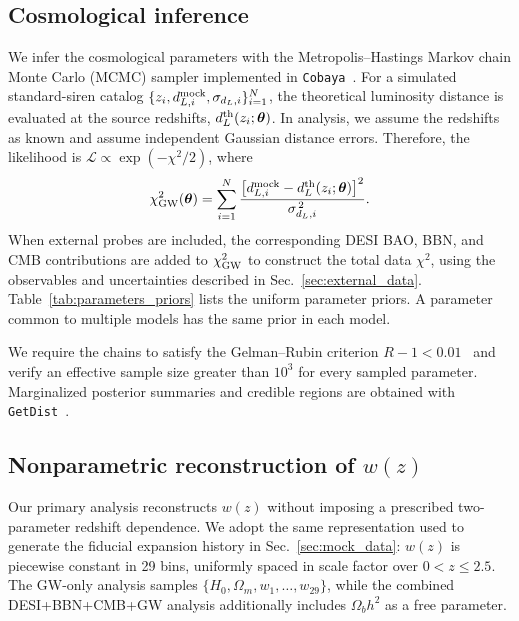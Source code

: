\documentclass[
  aps,
  prd,
  twocolumn,
  nofootinbib,
  superscriptaddress,
  floatfix,
  longbibliography
]{revtex4-2}
\begin{document}
\subsection{Cosmological inference}
\label{sec:likelihood_sampling}

We infer the cosmological parameters with the Metropolis--Hastings Markov
chain Monte Carlo (MCMC) sampler implemented in
\texttt{Cobaya}~\cite{Torrado2021}. For a simulated standard-siren catalog
$\{z_i,d_{L,i}^{\rm mock},\sigma_{d_L,i}\}_{i=1}^{N}$, the theoretical
luminosity distance is evaluated at the source redshifts,
$d_L^{\rm th}(z_i;\boldsymbol{\theta})$. In analysis, we assume the redshifts as known
and assume independent Gaussian distance errors. Therefore, the likelihood is
$\mathcal{L}\propto\exp(-\chi^2/2)$, where
\begin{equation}
 \chi^2_{\rm GW}(\boldsymbol{\theta}) =
 \sum_{i=1}^{N}
 \frac{\left[d_{L,i}^{\rm mock}
 -d_L^{\rm th}(z_i;\boldsymbol{\theta})\right]^2}
 {\sigma_{d_L,i}^{\,2}}.
 \label{eq:gw_chi2}
\end{equation}
When external probes are included, the corresponding DESI BAO, BBN, and CMB contributions
are added to $\chi^2_{\rm GW}$ to construct the total data $\chi^2$, using the observables
and uncertainties described in Sec.~\ref{sec:external_data}.
Table~\ref{tab:parameters_priors} lists the uniform parameter priors. A
parameter common to multiple models has the same prior in each model.



We require the chains to satisfy the Gelman--Rubin criterion
$R-1<0.01$~\cite{GelmanRubin} and verify an effective sample size greater
than $10^3$ for every sampled parameter. Marginalized posterior summaries
and credible regions are obtained with \texttt{GetDist}~\cite{Lewis_2019}.


\subsection{Nonparametric reconstruction of \texorpdfstring{$w(z)$}{w(z)}}
\label{sec:nonparametric_reconstruction}

Our primary analysis reconstructs $w(z)$ without imposing a prescribed
two-parameter redshift dependence. We adopt the same representation used
to generate the fiducial expansion history in Sec.~\ref{sec:mock_data}:
$w(z)$ is piecewise constant in 29 bins, uniformly spaced in scale factor
over $0<z\leq2.5$. The GW-only analysis samples
$\{H_0,\Omega_m,w_1,\ldots,w_{29}\}$, while the combined
DESI+BBN+CMB+GW analysis additionally includes
$\Omega_b h^2$ as a free parameter.
\end{document}
